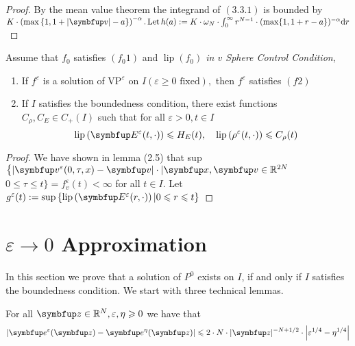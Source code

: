 \begin{lemma}
\begin{proof}
    By the mean value theorem the integrand of $(3.3 .1)$ is bounded by $K \cdot\left(\max \left\{1,1+\left|\vv\right|-a\right\}\right)^{-\alpha} . \operatorname{Let} h(a):=K \cdot \omega_{N} \cdot \int_{0}^{\infty} r^{N-1} \cdot(\max \{1,1+r-a\})^{-\alpha} \mathrm{d} r$
\end{proof}


\begin{lemma}
    Assume that $f_{0}$ satisfies $(f_0 1)$ and \textit{$\operatorname{lip}(f_0)$ in $v$ Sphere Control Condition},

    \begin{enumerate}
        \item If $f^{\varepsilon}$ is a solution of $\text{VP}^{\varepsilon}$ on $I(\varepsilon \geqslant 0 \text { fixed}),$ then $f^{\varepsilon}$ satisfies $(f 2)$
        \item If $I$ satisfies the boundedness condition, there exist functions $C_{\rho}, C_{E} \in C_{+}(I)$ such that for all $\varepsilon>0, t \in I$
        \[
        \operatorname{lip}\left(\vE^{\varepsilon}(t, \cdot)\right) \leqslant H_{E}(t), \quad \operatorname{lip}\left(\rho^{\varepsilon}(t, \cdot)\right) \leqslant C_{\rho}(t)
        \]
    \end{enumerate}
\end{lemma}

\begin{proof}
    We have shown in lemma (2.5) that sup $\left\{\left|\vv^{\varepsilon}(0, \tau, x)-\vv\right| \cdot |\vx, \vv\in \bbR^{2 N}\right.$ $0 \leqslant \tau \leqslant t\}=f_{v}^{\varepsilon}(t)<\infty$ for all $t \in I .$ Let $g^{\varepsilon}(t):=\sup \left\{\operatorname{lip}\left(\vE^{\varepsilon}(r, \cdot)\right) | 0 \leqslant r \leqslant t\right\}$
\end{proof}


\section{\texorpdfstring{$\varepsilon \rightarrow 0$}{Lg} Approximation}

In this section we prove that a solution of $P^{0}$ exists on $I$, if and only if $I$ satisfies the boundedness condition. We start with three technical lemmas.

\begin{lemma}
    For all $\vect{z} \in \bbR^{N}, \varepsilon, \eta \geqslant 0$ we have that
\[
\left|\vect{e}^{\varepsilon}(\vect{z})-\vect{e}^{\eta}(\vect{z})\right| \leqslant 2 \cdot N \cdot|\vect{z}|^{-N+1 / 2} \cdot\left|\varepsilon^{1 / 4}-\eta^{1 / 4}\right|
\]
\end{lemma}


\end{lemma}

